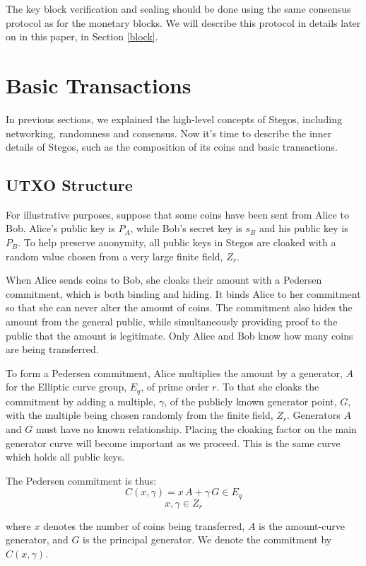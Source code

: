 \documentclass[a4paper, 10pt, conference]{ieeeconf}
\begin{document}
The key block verification and sealing should be done using the same consensus protocol as for the monetary blocks. We will describe this protocol in details later on in this paper, in Section \ref{block}.

\section{Basic Transactions}\label{transactions}

In previous sections, we explained the high-level concepts of Stegos, including networking, randomness and consensus. Now it's time to describe the inner details of Stegos, such as the composition of its coins and basic transactions.

\subsection{UTXO Structure}\label{utxo}

For illustrative purposes, suppose that some coins have been sent from Alice to Bob. Alice's public key is $P_A$, while Bob's secret key is $s_B$ and his public key is $P_B$. To help preserve anonymity, all public keys in Stegos are cloaked with a random value chosen from a very large finite field, $Z_r$.

When Alice sends coins to Bob, she cloaks their amount with a Pedersen commitment, which is both binding and hiding. It binds Alice to her commitment so that she can never alter the amount of coins. The commitment also hides the amount from the general public, while simultaneously providing proof to the public that the amount is legitimate.  Only Alice and Bob know how many coins are being transferred. 

To form a Pedersen commitment, Alice multiplies the amount by a generator, $A$ for the Elliptic curve group, $E_q$, of prime order $r$. To that she cloaks the commitment by adding a multiple, $\gamma$, of the publicly known generator point, $G$, with the multiple being chosen randomly from the finite field, $Z_r$. Generators $A$ and $G$ must have no known relationship. Placing the cloaking factor on the main generator curve will become important as we proceed. This is the same curve which holds all public keys. 

The Pedersen commitment is thus:
$$ C(x, \gamma) = x \, A + \gamma \, G \in E_q$$
$$x, \gamma \in Z_r$$

where $x$ denotes the number of coins being transferred, $A$ is the amount-curve generator, and $G$ is the principal generator. We denote the commitment by $C(x, \gamma)$. 
\end{document}
